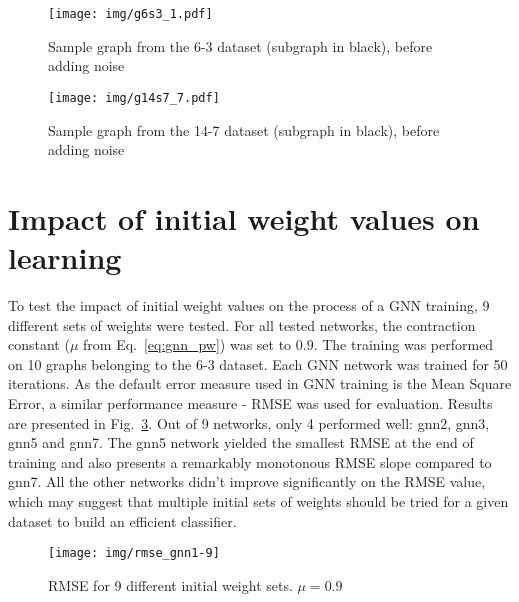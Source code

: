 \begin{figure}[h!]
\begin{center}
	\texttt{[image: img/g6s3\_1.pdf]}
	\caption{Sample graph from the 6-3 dataset (subgraph in black), before adding noise}
	\label{fig:gnn_g6s3}
\end{center}
\end{figure}

\begin{figure}[h!]
\begin{center}
	\texttt{[image: img/g14s7\_7.pdf]}
	\caption{Sample graph from the 14-7 dataset (subgraph in black), before adding noise}
	\label{fig:gnn_g6s3}
\end{center}
\end{figure}

\newpage
\section{Impact of initial weight values on learning}
To test the impact of initial weight values on the process of a GNN training, 9 different sets of weights were tested. For all tested networks, the contraction constant ($\mu$ from Eq.~\ref{eq:gnn_pw}) was set to $0.9$. The training was performed on 10 graphs belonging to the 6-3 dataset. Each GNN network was trained for 50 iterations. As the default error measure used in GNN training is the Mean Square Error, a similar performance measure - RMSE was used for evaluation. Results are presented in Fig.~\ref{fig:gnn_multiple}. Out of 9 networks, only 4 performed well: gnn2, gnn3, gnn5 and gnn7. The gnn5 network yielded the smallest RMSE at the end of training and also presents a remarkably monotonous RMSE slope compared to gnn7. All the other networks didn't improve significantly on the RMSE value, which may suggest that multiple initial sets of weights should be tried for a given dataset to build an efficient classifier.

\begin{figure}[h!]
\begin{center}
	\texttt{[image: img/rmse\_gnn1-9]}
	\caption{RMSE for 9 different initial weight sets. $\mu = 0.9$}
	\label{fig:gnn_multiple}
\end{center}
\end{figure}

\newpage

